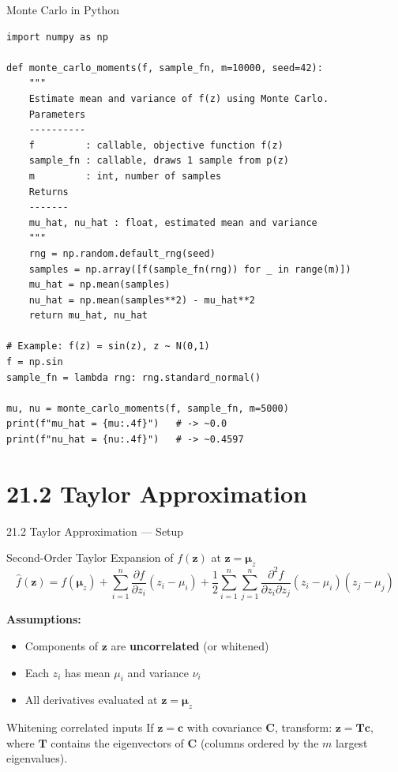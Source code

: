 \documentclass[aspectratio=169,10pt]{beamer}
\newcommand{\bz}{\mathbf{z}}
\newcommand{\bmu}{\boldsymbol{\mu}}
\newcommand{\hf}{\hat{f}}
\begin{document}
\begin{frame}[fragile]{Monte Carlo in Python}
\begin{lstlisting}
import numpy as np

def monte_carlo_moments(f, sample_fn, m=10000, seed=42):
    """
    Estimate mean and variance of f(z) using Monte Carlo.
    Parameters
    ----------
    f         : callable, objective function f(z)
    sample_fn : callable, draws 1 sample from p(z)
    m         : int, number of samples
    Returns
    -------
    mu_hat, nu_hat : float, estimated mean and variance
    """
    rng = np.random.default_rng(seed)
    samples = np.array([f(sample_fn(rng)) for _ in range(m)])
    mu_hat = np.mean(samples)
    nu_hat = np.mean(samples**2) - mu_hat**2
    return mu_hat, nu_hat

# Example: f(z) = sin(z), z ~ N(0,1)
f = np.sin
sample_fn = lambda rng: rng.standard_normal()

mu, nu = monte_carlo_moments(f, sample_fn, m=5000)
print(f"mu_hat = {mu:.4f}")   # -> ~0.0
print(f"nu_hat = {nu:.4f}")   # -> ~0.4597
\end{lstlisting}
\end{frame}

\section{21.2 Taylor Approximation}

\begin{frame}{21.2 Taylor Approximation --- Setup}
  \begin{block}{Second-Order Taylor Expansion of $f(\bz)$ at $\bz=\bmu_z$}
    \[
      \hf(\bz) = f(\bmu_z)
        + \sum_{i=1}^{n}\frac{\partial f}{\partial z_i}(z_i-\mu_i)
        + \frac{1}{2}\sum_{i=1}^{n}\sum_{j=1}^{n}
          \frac{\partial^2 f}{\partial z_i\partial z_j}(z_i-\mu_i)(z_j-\mu_j)
    \]
  \end{block}

  \textbf{Assumptions:}
  \begin{itemize}
    \item Components of $\bz$ are \textbf{uncorrelated} (or whitened)
    \item Each $z_i$ has mean $\mu_i$ and variance $\nu_i$
    \item All derivatives evaluated at $\bz = \bmu_z$
  \end{itemize}

  \begin{block}{Whitening correlated inputs}
    If $\bz=\mathbf{c}$ with covariance $\mathbf{C}$, transform:
    $\bz = \mathbf{T}\mathbf{c}$,
    where $\mathbf{T}$ contains the eigenvectors of $\mathbf{C}$
    (columns ordered by the $m$ largest eigenvalues).
  \end{block}
\end{frame}
\end{document}
